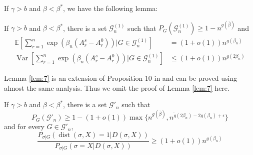 \documentclass[entropy,article,submit,moreauthors,pdftex]{Definitions/mdpi}
\newcommand{\cG}{\mathcal{G}}
\newcommand{\1}{\mathbbm{1}}
\DeclareMathOperator{\Var}{Var}
\DeclareMathOperator{\Dist}{dist}
\begin{document}
If $\gamma > b$ and $\beta < \beta^*$, we have the following lemma:
\begin{Lemma}\label{lem:7}
	If $\gamma > b$ and $\beta < \beta^*$, there is a set $\cG^{(1)}_n$ such that
	$P_G(\cG^{(1)}_n) \geq 1-n^{g(\bar{\beta})}$
	and
	\begin{align}
	\mathbb{E}[\sum_{r=1}^n \exp(\beta_n (A_r^s - A_r^0)) | G \in \cG^{(1)}_n] &= (1+o(1))n^{g(\beta_n)} \\
	\Var[\sum_{r=1}^n \exp(\beta_n (A_r^s - A_r^0)) | G \in \cG^{(1)}_n] &\leq (1+o(1)) n^{g(2\beta_n)} 
	\end{align}
\end{Lemma}
Lemma \ref{lem:7} is an extension of Proposition 10 in \cite{ye2020exact} and can be proved using almost the same analysis. Thus we omit the
proof of Lemma \ref{lem:7} here.
\begin{Lemma}\label{prop:large2}
	If $\gamma > b$ and $\beta < \beta^*$, there is a set $\cG'_n$ such that
	\begin{equation}
	P_G(\cG'_n) \geq 1 - (1+o(1))\max\{n^{g(\bar{\beta})}, n^{\tilde{g}(2\beta_n) - 2g(\beta_n) + \epsilon} \}
	\end{equation}
	and for every $G \in \cG'_n$,
	\begin{equation}\label{eq:diff1g}
	\frac{P_{\sigma|G}(\Dist(\sigma, X)=1 | D(\sigma, X))}
	{P_{\sigma|G}(\sigma=X | D(\sigma, X))} \geq (1+o(1))n^{g(\beta_n)}
	\end{equation}
	
\end{Lemma}
\end{document}
